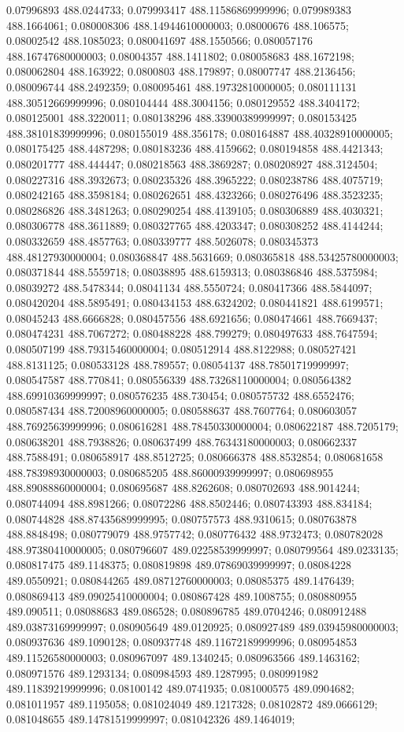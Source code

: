 0.07996893 488.0244733; 0.079993417 488.11586869999996; 0.079989383 488.1664061; 0.080008306 488.14944610000003; 0.08000676 488.106575; 0.08002542 488.1085023; 0.080041697 488.1550566; 0.080057176 488.16747680000003; 0.08004357 488.1411802; 0.080058683 488.1672198; 0.080062804 488.163922; 0.0800803 488.179897; 0.08007747 488.2136456; 0.080096744 488.2492359; 0.080095461 488.19732810000005; 0.080111131 488.30512669999996; 0.080104444 488.3004156; 0.080129552 488.3404172; 0.080125001 488.3220011; 0.080138296 488.33900389999997; 0.080153425 488.38101839999996; 0.080155019 488.356178; 0.080164887 488.40328910000005; 0.080175425 488.4487298; 0.080183236 488.4159662; 0.080194858 488.4421343; 0.080201777 488.444447; 0.080218563 488.3869287; 0.080208927 488.3124504; 0.080227316 488.3932673; 0.080235326 488.3965222; 0.080238786 488.4075719; 0.080242165 488.3598184; 0.080262651 488.4323266; 0.080276496 488.3523235; 0.080286826 488.3481263; 0.080290254 488.4139105; 0.080306889 488.4030321; 0.080306778 488.3611889; 0.080327765 488.4203347; 0.080308252 488.4144244; 0.080332659 488.4857763; 0.080339777 488.5026078; 0.080345373 488.48127930000004; 0.080368847 488.5631669; 0.080365818 488.53425780000003; 0.080371844 488.5559718; 0.08038895 488.6159313; 0.080386846 488.5375984; 0.08039272 488.5478344; 0.08041134 488.5550724; 0.080417366 488.5844097; 0.080420204 488.5895491; 0.080434153 488.6324202; 0.080441821 488.6199571; 0.08045243 488.6666828; 0.080457556 488.6921656; 0.080474661 488.7669437; 0.080474231 488.7067272; 0.080488228 488.799279; 0.080497633 488.7647594; 0.080507199 488.79315460000004; 0.080512914 488.8122988; 0.080527421 488.8131125; 0.080533128 488.789557; 0.08054137 488.78501719999997; 0.080547587 488.770841; 0.080556339 488.73268110000004; 0.080564382 488.69910369999997; 0.080576235 488.730454; 0.080575732 488.6552476; 0.080587434 488.72008960000005; 0.080588637 488.7607764; 0.080603057 488.76925639999996; 0.080616281 488.78450330000004; 0.080622187 488.7205179; 0.080638201 488.7938826; 0.080637499 488.76343180000003; 0.080662337 488.7588491; 0.080658917 488.8512725; 0.080666378 488.8532854; 0.080681658 488.78398930000003; 0.080685205 488.86000939999997; 0.080698955 488.89088860000004; 0.080695687 488.8262608; 0.080702693 488.9014244; 0.080744094 488.8981266; 0.08072286 488.8502446; 0.080743393 488.834184; 0.080744828 488.87435689999995; 0.080757573 488.9310615; 0.080763878 488.8848498; 0.080779079 488.9757742; 0.080776432 488.9732473; 0.080782028 488.97380410000005; 0.080796607 489.02258539999997; 0.080799564 489.0233135; 0.080817475 489.1148375; 0.080819898 489.07869039999997; 0.08084228 489.0550921; 0.080844265 489.08712760000003; 0.08085375 489.1476439; 0.080869413 489.09025410000004; 0.080867428 489.1008755; 0.080880955 489.090511; 0.08088683 489.086528; 0.080896785 489.0704246; 0.080912488 489.03873169999997; 0.080905649 489.0120925; 0.080927489 489.03945980000003; 0.080937636 489.1090128; 0.080937748 489.11672189999996; 0.080954853 489.11526580000003; 0.080967097 489.1340245; 0.080963566 489.1463162; 0.080971576 489.1293134; 0.080984593 489.1287995; 0.080991982 489.11839219999996; 0.08100142 489.0741935; 0.081000575 489.0904682; 0.081011957 489.1195058; 0.081024049 489.1217328; 0.08102872 489.0666129; 0.081048655 489.14781519999997; 0.081042326 489.1464019; 